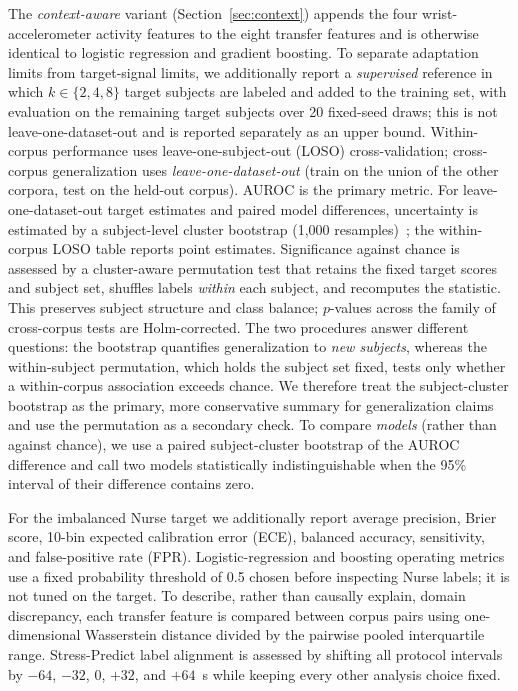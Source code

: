 \documentclass[healthcare,article,submit,moreauthors,pdftex]{Definitions/mdpi}
\begin{document}
The \emph{context-aware} variant (Section~\ref{sec:context}) appends the four
wrist-accelerometer activity features to the eight transfer features and is
otherwise identical to logistic regression and gradient boosting. To separate
adaptation limits from target-signal limits, we additionally report a
\emph{supervised} reference in which $k \in \{2,4,8\}$ target subjects are
labeled and added to the training set, with evaluation on the remaining target
subjects over 20 fixed-seed draws; this is not leave-one-dataset-out and is
reported separately as an upper bound. Within-corpus performance uses
leave-one-subject-out (LOSO) cross-validation; cross-corpus generalization uses
\emph{leave-one-dataset-out} (train on the union of the other corpora, test on
the held-out corpus). AUROC is the primary metric. For leave-one-dataset-out
target estimates and paired model differences, uncertainty is estimated by a
subject-level cluster bootstrap (1{,}000 resamples)~\cite{efron1993bootstrap};
the within-corpus LOSO table reports point estimates. Significance against chance
is assessed by a cluster-aware permutation test that retains the fixed target
scores and subject set, shuffles labels \emph{within} each subject, and
recomputes the statistic. This preserves subject structure and class balance;
$p$-values across the family of cross-corpus tests are Holm-corrected.
The two procedures answer different questions: the bootstrap quantifies
generalization to \emph{new subjects}, whereas the within-subject permutation,
which holds the subject set fixed, tests only whether a within-corpus association
exceeds chance. We therefore treat the subject-cluster bootstrap as the primary,
more conservative summary for generalization claims and use the permutation as a
secondary check. To compare \emph{models} (rather than against chance), we use a
paired subject-cluster bootstrap of the AUROC difference and call two models
statistically indistinguishable when the 95\% interval of their difference
contains zero.

For the imbalanced Nurse target we additionally report average precision, Brier
score, 10-bin expected calibration error (ECE), balanced accuracy, sensitivity,
and false-positive rate (FPR). Logistic-regression and boosting operating
metrics use a fixed probability threshold of 0.5 chosen before inspecting Nurse
labels; it is not tuned on the target. To describe, rather than causally explain,
domain discrepancy, each transfer feature is compared between corpus pairs using
one-dimensional Wasserstein distance divided by the pairwise pooled interquartile
range. Stress-Predict label alignment is assessed by shifting all protocol
intervals by $-64$, $-32$, 0, $+32$, and $+64$~s while keeping every other
analysis choice fixed.
\end{document}
